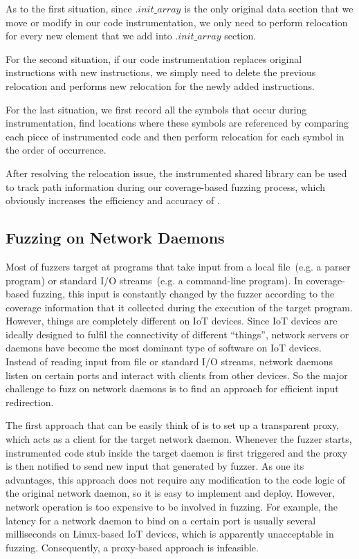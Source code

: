 As to the first situation, since $.init\_array$ is the only original data section that we move or modify in our code instrumentation, we only need to perform relocation for every new element that we add into $.init\_array$ section.

For the second situation, if our code instrumentation replaces original instructions with new instructions, we simply need to delete the previous relocation and performs new relocation for the newly added instructions. 

For the last situation, we first record all the symbols that occur during instrumentation, find locations where these symbols are referenced by comparing each piece of instrumented code and then perform relocation for each symbol in the order of occurrence.

After resolving the relocation issue, the instrumented shared library can be used to track path information during our coverage-based fuzzing process, which obviously increases the efficiency and accuracy of \sysname.

\subsection{Fuzzing on Network Daemons}\label{sec:design:daemons}

Most of fuzzers target at programs that take input from a local file~(e.g. a parser program) or standard I/O streams~(e.g. a command-line program). In coverage-based fuzzing, this input is constantly changed by the fuzzer according to the coverage information that it collected during the execution of the target program. However, things are completely different on IoT devices. Since IoT devices are ideally designed to fulfil the connectivity of different ``things'', network servers or daemons have become the most dominant type of software on IoT devices. Instead of reading input from file or standard I/O streams, network daemons listen on certain ports and interact with clients from other devices. So the major challenge to fuzz on network daemons is to find an approach for efficient input redirection. 

The first approach that can be easily think of is to set up a transparent proxy, which acts as a client for the target network daemon. Whenever the fuzzer starts, instrumented code stub inside the target daemon is first triggered and the proxy is then notified to send new input that generated by fuzzer. As one its advantages, this approach does not require any modification to the code logic of the original network daemon, so it is easy to implement and deploy. However, network operation is too expensive to be involved in fuzzing. For example, the latency for a network daemon to bind on a certain port is usually several milliseconds on Linux-based IoT devices, which is apparently unacceptable in fuzzing. Consequently, a proxy-based approach is infeasible.

